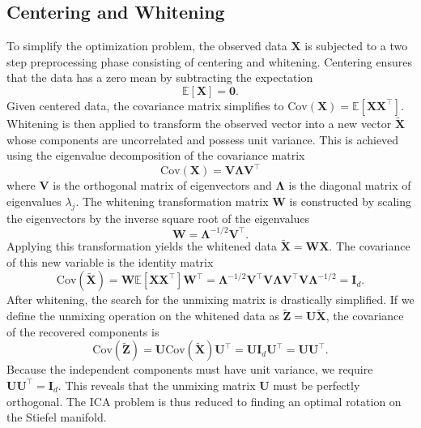 \documentclass[12pt,a4paper,twoside,openany]{book}
\begin{document}
\subsection{Centering and Whitening}
To simplify the optimization problem, the observed data $\mathbf{X}$ is subjected to a two step preprocessing phase consisting of centering and whitening. 
Centering ensures that the data has a zero mean by subtracting the expectation
\begin{equation}
    \mathbb{E}[\mathbf{X}] = \mathbf{0}.
\end{equation}
Given centered data, the covariance matrix simplifies to $\mathrm{Cov}(\mathbf{X}) = \mathbb{E}[\mathbf{X}\mathbf{X}^\top]$. 
Whitening is then applied to transform the observed vector into a new vector $\widetilde{\mathbf{X}}$ whose components are uncorrelated and possess unit variance. 
This is achieved using the eigenvalue decomposition of the covariance matrix
\begin{equation}
    \mathrm{Cov}(\mathbf{X}) = \mathbf{V}\mathbf{\Lambda}\mathbf{V}^\top
\end{equation}
where $\mathbf{V}$ is the orthogonal matrix of eigenvectors and $\mathbf{\Lambda}$ is the diagonal matrix of eigenvalues $\lambda_j$. 
The whitening transformation matrix $\mathbf{W}$ is constructed by scaling the eigenvectors by the inverse square root of the eigenvalues
\begin{equation}
    \mathbf{W} = \mathbf{\Lambda}^{-1/2} \mathbf{V}^\top.
\end{equation}
Applying this transformation yields the whitened data $\widetilde{\mathbf{X}} = \mathbf{W}\mathbf{X}$. The covariance of this new variable is the identity matrix
\begin{equation}
    \mathrm{Cov}(\widetilde{\mathbf{X}}) = \mathbf{W} \mathbb{E}[\mathbf{X}\mathbf{X}^\top] \mathbf{W}^\top = \mathbf{\Lambda}^{-1/2} \mathbf{V}^\top \mathbf{V} \mathbf{\Lambda} \mathbf{V}^\top \mathbf{V} \mathbf{\Lambda}^{-1/2} = \mathbf{I}_d.
\end{equation}
After whitening, the search for the unmixing matrix is drastically simplified. 
If we define the unmixing operation on the whitened data as $\widetilde{\mathbf{Z}} = \mathbf{U} \widetilde{\mathbf{X}}$, the covariance of the recovered components is
\begin{equation}
    \mathrm{Cov}(\widetilde{\mathbf{Z}}) = \mathbf{U} \mathrm{Cov}(\widetilde{\mathbf{X}}) \mathbf{U}^\top = \mathbf{U} \mathbf{I}_d \mathbf{U}^\top = \mathbf{U}\mathbf{U}^\top.
\end{equation}
Because the independent components must have unit variance, we require $\mathbf{U}\mathbf{U}^\top = \mathbf{I}_d$. This reveals that the unmixing matrix $\mathbf{U}$ must be perfectly orthogonal. 
The ICA problem is thus reduced to finding an optimal rotation on the Stiefel manifold.
\end{document}
